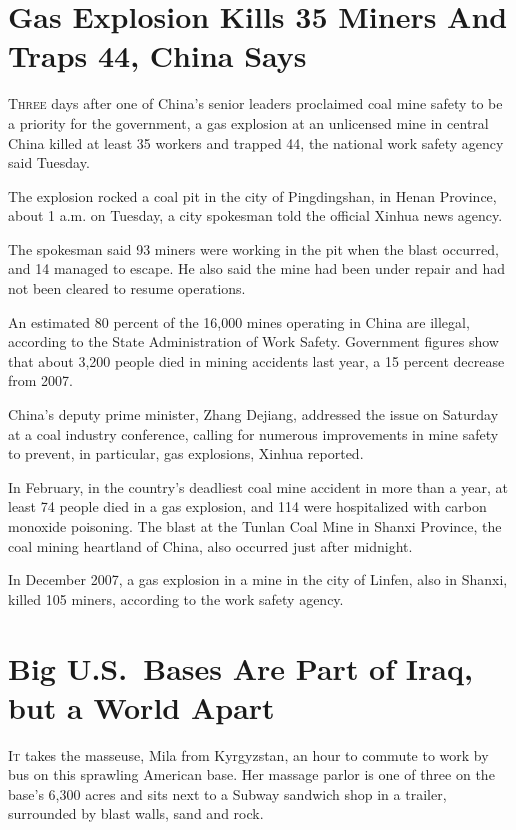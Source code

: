 ﻿\documentclass[12pt]{article}
\begin{document}
\section{Gas Explosion Kills 35 Miners And Traps 44, China Says}

\lettrine{T}{hree} days after one of China's senior leaders proclaimed coal mine safety to be a
priority for the government, a gas explosion at an unlicensed mine in central China killed at least
35 workers and trapped 44, the national work safety agency said Tuesday.

The explosion rocked a coal pit in the city of Pingdingshan, in Henan Province, about 1 a.m. on
Tuesday, a city spokesman told the official Xinhua news agency.

The spokesman said 93 miners were working in the pit when the blast occurred, and 14 managed to
escape. He also said the mine had been under repair and had not been cleared to resume operations.

An estimated 80 percent of the 16,000 mines operating in China are illegal, according to the State
Administration of Work Safety. Government figures show that about 3,200 people died in mining
accidents last year, a 15 percent decrease from 2007.

China's deputy prime minister, Zhang Dejiang, addressed the issue on Saturday at a coal industry
conference, calling for numerous improvements in mine safety to prevent, in particular, gas
explosions, Xinhua reported.

In February, in the country's deadliest coal mine accident in more than a year, at least 74 people
died in a gas explosion, and 114 were hospitalized with carbon monoxide poisoning. The blast at the
Tunlan Coal Mine in Shanxi Province, the coal mining heartland of China, also occurred just after
midnight.

In December 2007, a gas explosion in a mine in the city of Linfen, also in Shanxi, killed 105
miners, according to the work safety agency.

\section{Big U.S.~Bases Are Part of Iraq, but a World Apart}

\lettrine{I}{t} takes the masseuse\cite{masseuse}, Mila from Kyrgyzstan, an hour to
commute\cite{commute} to work by bus on this sprawling American base. Her massage parlor is one of
three on the base's 6,300 acres and sits next to a Subway sandwich shop in a trailer, surrounded by
blast walls, sand and rock.
\end{document}
